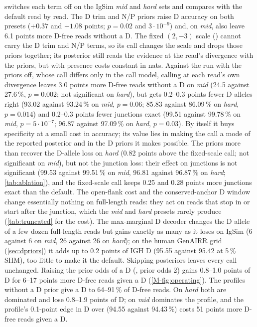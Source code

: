\documentclass[11pt,a4paper]{article}
\begin{document}
 switches each term off on the IgSim \emph{mid} and
\emph{hard} sets and compares with the default read by read. The D trim and
N/P priors raise D accuracy on both presets ($+0.37$ and $+1.08$ points;
$p=0.02$ and $3\cdot10^{-9}$) and, on \emph{mid}, also leave 6.1 points more
D-free reads without a D. The fixed $(2,-3)$ scale ()
cannot carry the D trim and N/P terms, so its call changes the scale and
drops those priors together; its posterior still reads the evidence at the
read's divergence with the priors, but with presence costs constant in nats. Against the run
with the priors off, whose call differs only in the call model, calling at
each read's own divergence leaves 3.0 points more D-free reads without a D
on \emph{mid} (24.5 against 27.6\,\%, $p=0.002$; not significant on
\emph{hard}), but gets 0.2--0.3 points fewer D alleles right (93.02 against
93.24\,\% on \emph{mid}, $p=0.06$; 85.83 against 86.09\,\% on \emph{hard},
$p=0.014$) and 0.2--0.3 points fewer junctions exact (99.51 against
99.78\,\% on \emph{mid}, $p=5\cdot10^{-7}$; 96.87 against 97.09\,\% on
\emph{hard}, $p=0.03$). By itself it buys specificity at a small cost in
accuracy; its value lies in making the call a mode of the reported
posterior and in the D priors it makes possible. The priors more than
recover the D-allele loss on \emph{hard} (0.82 points above the fixed-scale
call; not significant on \emph{mid}), but not the junction loss: their effect on junctions is not significant
(99.53 against 99.51\,\% on \emph{mid}, 96.81 against 96.87\,\% on
\emph{hard}; \cref{tab:ablation}), and the fixed-scale call keeps 0.25 and
0.28 points more junctions exact than the default. The open-flank cost and
the conserved-anchor D window change essentially nothing on full-length
reads: they act on reads that stop in or start after the junction, which the
\emph{mid} and \emph{hard} presets rarely produce (\cref{tab:truncated} for
the cost). The max-marginal D decoder changes the D allele of a few dozen
full-length reads but gains exactly as many as it loses on IgSim (6 against
6 on \emph{mid}, 26 against 26 on \emph{hard}); on the human GenAIRR grid
(\cref{sec:dpriors}) it adds up to 0.2 points of IGH D (95.55 against 95.42 at 5\,\% SHM), too little to make
it the default. Skipping posteriors leaves every call unchanged. Raising the
prior odds of a D (, prior odds 2) gains 0.8--1.0 points of
D for 6--17 points more D-free reads given a D (\cref{M-fig:operating}). The
profiles without a D prior give a D to 64--91\,\% of D-free reads. On
\emph{hard} both are dominated and lose 0.8--1.9 points of D; on \emph{mid}
 dominates the  profile, and the
 profile's 0.1-point edge in D over  (94.55
against 94.43\,\%) costs 51 points more D-free reads given a D.
\end{document}
